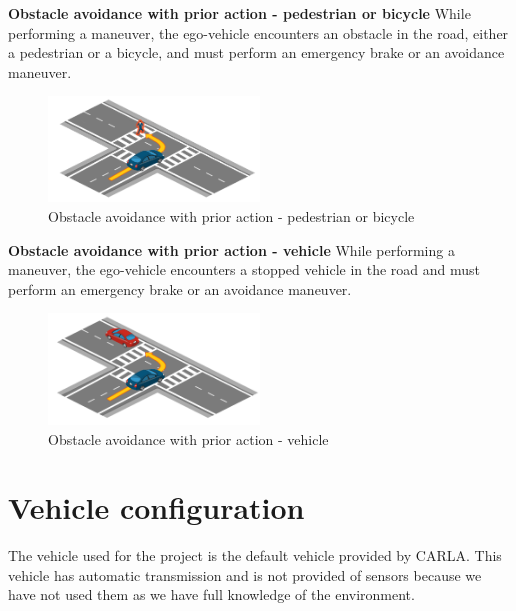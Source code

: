 \documentclass{article}
\begin{document}
\textbf{Obstacle avoidance with prior action - pedestrian or bicycle} 
While performing a maneuver, the ego-vehicle encounters an obstacle in the road, either a pedestrian or a bicycle, and must perform an emergency brake 
or an avoidance maneuver.
\begin{figure}[h]
    \centering
    \includegraphics[width=0.5\textwidth]{img/TR04.png}
    \caption{Obstacle avoidance with prior action - pedestrian or bicycle} \label{Scenario_obsAvoidanceWithPedBic}
\end{figure}

\textbf{Obstacle avoidance with prior action - vehicle} 
While performing a maneuver, the ego-vehicle encounters a stopped vehicle in the road and must perform an emergency brake or an avoidance maneuver.
\begin{figure}[h]
    \centering
    \includegraphics[width=0.5\textwidth]{img/TR19a.png}
    \caption{Obstacle avoidance with prior action - vehicle} \label{Scenario_obsAvoidanceWithoutVehicle}
\end{figure}

\section{Vehicle configuration}
The vehicle used for the project is the default vehicle provided by CARLA. 
This vehicle has automatic transmission and is not provided of sensors because we have not used them as we have full knowledge of the environment.
\end{document}
